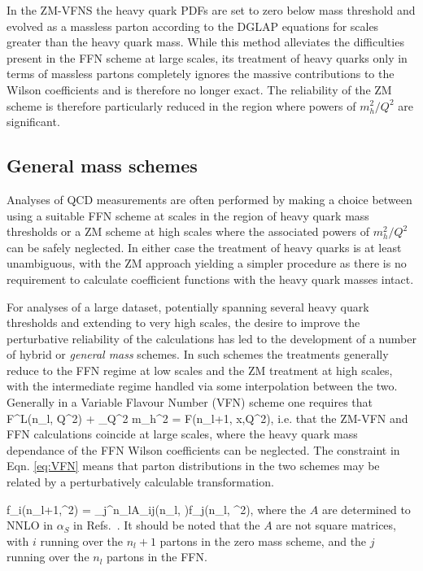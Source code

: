 In the ZM-VFNS the heavy quark PDFs are set to zero below mass threshold and evolved as a massless parton according to the DGLAP equations for scales greater than the heavy quark mass. While this method alleviates the difficulties present in the FFN scheme at large scales, its treatment of heavy quarks only in terms of massless partons completely ignores the massive contributions to the Wilson coefficients and is therefore no longer exact. The reliability of the ZM scheme is therefore particularly reduced in the region where powers of $m_h^2/Q^2$ are significant. 
\subsection{General mass schemes}

Analyses of QCD measurements are often performed by making a choice between using a suitable FFN scheme at scales in the region of heavy quark mass thresholds or a ZM scheme at high scales where the associated powers of $m_h^2/Q^2$ can be safely neglected. In either case the treatment of heavy quarks is at least unambiguous, with the ZM approach yielding a simpler procedure as there is no requirement to calculate coefficient functions with the heavy quark masses intact.

For analyses of a large dataset, potentially spanning several heavy quark thresholds and extending to very high scales, the desire to improve the perturbative reliability of the calculations has led to the development of a number of hybrid or \emph{general mass} schemes. In such schemes the treatments generally reduce to the FFN regime at low scales and the ZM treatment at high scales, with the intermediate regime handled via some interpolation between the two. Generally in a Variable Flavour Number (VFN) scheme one requires that
\be F^{L}(n_l, Q^2) + \lim_{Q^2 \gg m_h^2} \left[ F^{H}(n_l, Q^2,m_h^2)\right] =  F(n_l+1, x,Q^2), \label{eq:VFN}\ee
i.e. that the ZM-VFN and FFN calculations coincide at large scales, where the heavy quark mass dependance of the FFN Wilson coefficients can be neglected. The constraint in Eqn. \ref{eq:VFN} means that parton distributions in the two schemes may be related by a perturbatively calculable transformation.

\be f_i(n_l+1,\mu^2) = \sum_j^{n_l}A_{ij}\left(n_l, \right)\otimes f_j(n_l, \mu^2), \label{eq:FLVreln}\ee
where the $A$ are determined to NNLO in $\alpha_S$ in Refs.~\cite{Buza:1995ie,Buza:1996wv}. It should be noted that the $A$ are not square matrices, with $i$ running over the $n_l+1$ partons in the zero mass scheme, and the $j$ running over the $n_l$ partons in the FFN.

